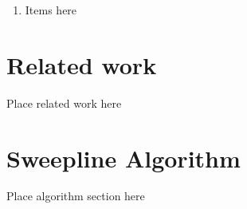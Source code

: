 \documentclass{egpubl}
\renewcommand{\paragraph}[1]{\noindent \textbf{#1}}
\begin{document}
\begin{enumerate}
\item Items here
\end{enumerate}


\section{Related work}
Place related work here



\section{Sweepline Algorithm}
\label{sec:sweepline-algorithm}

 Place algorithm section here
\end{document}

